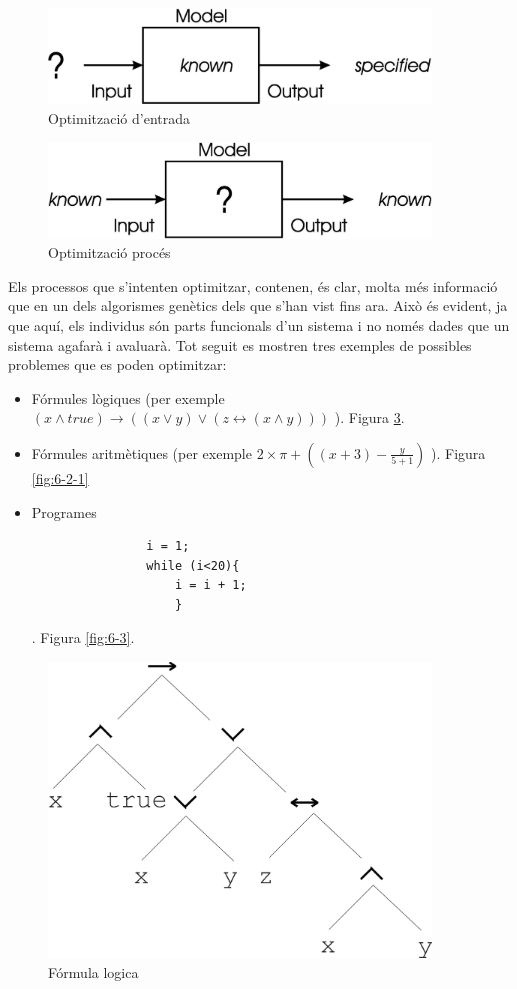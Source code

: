 \begin{figure} \centering \includegraphics[width=4in]{intro/1-4.jpg}
\caption{\label{fig:ch1-4}Optimització d'entrada}
\end{figure}
\begin{figure} \centering \includegraphics[width=4in]{intro/1-5.jpg}
\caption{\label{fig:ch1-5}Optimització procés}
\end{figure}

Els processos que s'intenten optimitzar, contenen, és clar, molta més informació
que en un dels algorismes genètics dels que s'han vist fins ara.  Això és
evident, ja que aquí, els individus són parts funcionals d'un sistema i no
només dades que un sistema agafarà i avaluarà.  Tot seguit es mostren tres
exemples de possibles problemes que es poden optimitzar:

\begin{itemize}
	\item Fórmules lògiques (per exemple $ (x\land true) \rightarrow ((x \lor y)
		\lor (z \leftrightarrow ( x \land y)))$ ). Figura \ref{fig:6-2-2}.
	\item Fórmules aritmètiques (per exemple $2\times\pi+((x+3)-\frac{y}{5+1})$
		).  Figura \ref{fig:6-2-1}
	\item Programes 
		\begin{verbatim}
				i = 1;
				while (i<20){
					i = i + 1;
					}
		\end{verbatim}. Figura \ref{fig:6-3}.
\end{itemize}

\begin{figure} \centering \includegraphics[width=4in]{intro/6-2-2.jpg}
\caption{\label{fig:6-2-2}Fórmula logica}
\end{figure}

